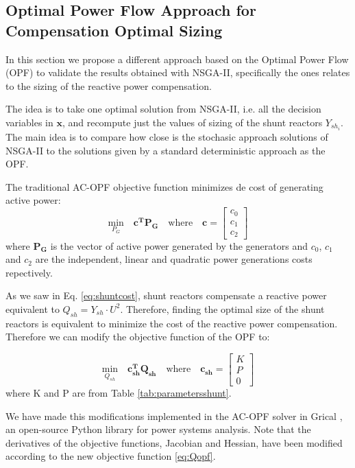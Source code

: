\documentclass[a4paper,11pt, titlepage, twoside]{article}
\begin{document}
\subsection{Optimal Power Flow Approach for Compensation Optimal Sizing}

In this section we propose a different approach based on the Optimal Power Flow (OPF) to validate the results obtained with NSGA-II, specifically the ones relates to
the sizing of the reactive power compensation.\par 

The idea is to take one optimal solution from NSGA-II, i.e. all the decision variables in $\mathbf{x}$, and recompute just the values of sizing of the shunt reactors $Y_{sh_i}$. The main idea is to compare how close is the 
stochasic approach solutions of NSGA-II to the solutions given by a standard deterministic approach as the OPF. \par


The traditional AC-OPF objective function \cite{opfnotes} minimizes de cost of generating active power:
\begin{equation}
    \underset{P_G}{\text{min}} \quad \mathbf{c^T} \mathbf{P_G} \quad \text{where} \quad \mathbf{c} = \begin{bmatrix} c_0 \\ c_1 \\ c_2 \end{bmatrix}
\end{equation}
where $\mathbf{P_G}$ is the vector of active power generated by the generators and $c_0$, $c_1$ and $c_2$ are the independent, linear and quadratic power generations costs repectively.

As we saw in Eq. \ref{eq:shuntcost}, shunt reactors compensate a reactive power equivalent to $Q_{sh} = Y_{sh} \cdot U^2$. Therefore, finding the optimal size of the shunt reactors is equivalent
to minimize the cost of the reactive power compensation. Therefore we can modify the objective function of the OPF to:

\begin{equation}\label{eq:Qopf}
\underset{Q_{sh}}{\text{min}} \quad \mathbf{c_{sh}^T} \mathbf{Q_{sh}} \quad \text{where} \quad \mathbf{c_{sh}} = \begin{bmatrix} K \\ P \\ 0 \end{bmatrix}
\end{equation}
where K and P are from Table \ref{tab:parametersshunt}.\par
We have made this modifications implemented in the AC-OPF solver in Grical \cite{gridcal}, an open-source Python library for power systems analysis. Note that the derivatives of the objective functions, Jacobian and Hessian, have
been modified according to the new objective function \ref{eq:Qopf}.
\end{document}
